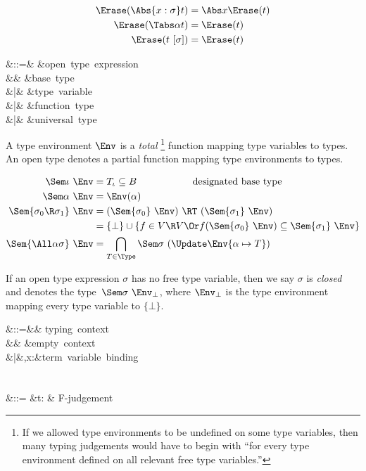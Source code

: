\documentclass{amsart}
\begin{document}
\begin{align*}
\Erase(\Abs{x:\sigma}t) & = \Abs x\Erase(t) \\
\Erase(\Tabs\alpha t) &= \Erase(t) \\
\Erase(t~[\sigma]) &= \Erase(t)
\end{align*}

\label{open-types}

\begin{syntax}
\sigma &::=& &\mbox{open type expression}\\
&& \iota &\mbox{base type}\\
&|& \alpha &\mbox{type variable}\\
&|& \sigma\R\sigma &\mbox{function type}\\
&|& \All\alpha\sigma &\mbox{universal type}
\end{syntax}%

\label{interp-open-types}

A type environment $\Env$ is a \emph{total}%
%
\footnote{%
If we allowed type environments to be undefined on some type
variables, then many typing judgements would have to begin with
``for every type environment defined on all relevant free type
variables.''
%
} %
function mapping type variables to types.
An open type denotes a partial function mapping type environments
to types.

\begin{align*}
\Sem\iota~\Env &= T_\iota \subseteq B\hspace{2cm}\mbox{designated base type}\\
\Sem\alpha~\Env &= \Env(\alpha)\\
\Sem{\sigma_0\R\sigma_1}~\Env &= (\Sem{\sigma_0}~\Env)\ \RT\ (\Sem{\sigma_1}~\Env)\\
&=\{\bot\}\cup\{f\in V\R V\Or f(\Sem{\sigma_0}~\Env)\subseteq\Sem{\sigma_1}~\Env\}\\
\Sem{\All\alpha\sigma}~\Env &=
\bigcap_{T\in\Type} \Sem\sigma~(\Update\Env{\alpha\mapsto T})
\end{align*}

If an open type expression $\sigma$ has no free type variable,
then we say $\sigma$ is \emph{closed} and denotes the
type~$\Sem\sigma~\Env_\bot$, where $\Env_\bot$ is the type
environment mapping every type variable to $\{\bot\}$.



\begin{syntax}
\Gamma &::=&& \mbox{typing context}\\
&& \emptyset &\mbox{empty context}\\
&|&\Gamma,x:\sigma &\mbox{term variable binding}\\
\\\\
\JF &::=
&\Gamma\vdash t:\sigma
& \mbox{F-judgement}
\end{syntax}
\end{document}
